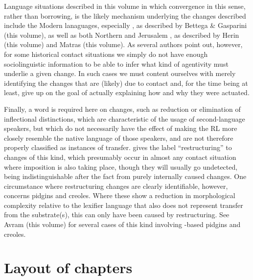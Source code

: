 \documentclass[output=paper]{langsci/langscibook}
\begin{document}
Language situations described in this volume in which {convergence} in this sense, rather than borrowing, is the likely mechanism underlying the changes described include the Modern  lanaguages, especially , as described by Bettega \& Gasparini (this volume), as well as both Northern and Jerusalem , as described by Herin (this volume) and Matras (this volume). As several authors point out, however, for some historical contact situations we simply do not have enough sociolinguistic information to be able to infer what kind of agentivity must underlie a given change. In such cases we must content ourselves with merely identifying the changes that are (likely) due to contact and, for the time being at least, give up on the goal of actually explaining how and why they were {actuated}.

Finally, a word is required here on changes, such as reduction or elimination of {inflectional} distinctions, which are characteristic of the usage of second-language speakers, but which do not necessarily have the effect of making the {RL} more closely resemble the native language of those speakers, and are not therefore properly classified as instances of {transfer}. \citet{Lucas2015} gives the label ``restructuring'' to changes of this kind, which presumably occur in almost any contact situation where {imposition} is also taking place, though they will usually go undetected, being indistinguishable after the fact from purely internally caused changes. One circumstance where restructuring changes are clearly identifiable, however, concerns pidgins and creoles. Where these show a reduction in morphological complexity {relative} to the {lexifier} language that also does not represent {transfer} from the {substrate}(s), this can only have been caused by restructuring. See Avram (this volume) for several cases of this kind involving -based pidgins and creoles.

\section{Layout of chapters}\label{introstructure}
\end{document}
